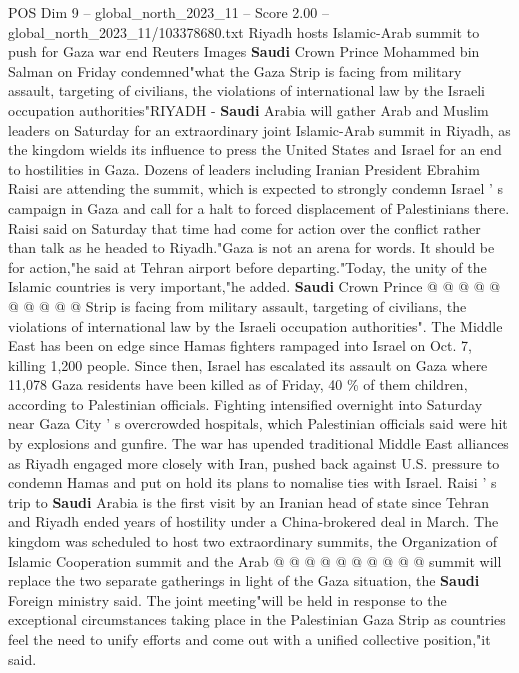\begin{textsample}{POS Dim 9 – global\_north\_2023\_11 – Score 2.00 – global\_north\_2023\_11/103378680.txt}  \label{ex:f9_pos_378}
Riyadh hosts Islamic-Arab summit to push for Gaza war end Reuters Images \textbf{Saudi} Crown Prince Mohammed bin Salman on Friday condemned"what the Gaza Strip is facing from military assault, targeting of civilians, the violations of international law by the Israeli occupation authorities"RIYADH - \textbf{Saudi} Arabia will gather Arab and Muslim leaders on Saturday for an extraordinary joint Islamic-Arab summit in Riyadh, as the kingdom wields its influence to press the United States and Israel for an end to hostilities in Gaza.
Dozens of leaders including Iranian President Ebrahim Raisi are attending the summit, which is expected to strongly condemn Israel ' s campaign in Gaza and call for a halt to forced displacement of Palestinians there.
Raisi said on Saturday that time had come for action over the conflict rather than talk as he headed to Riyadh."Gaza is not an arena for words.
It should be for action,"he said at Tehran airport before departing."Today, the unity of the Islamic countries is very important,"he added. \textbf{Saudi} Crown Prince @ @ @ @ @ @ @ @ @ @ Strip is facing from military assault, targeting of civilians, the violations of international law by the Israeli occupation authorities".
The Middle East has been on edge since Hamas fighters rampaged into Israel on Oct. 7, killing 1,200 people.
Since then, Israel has escalated its assault on Gaza where 11,078 Gaza residents have been killed as of Friday, 40 \% of them children, according to Palestinian officials.
Fighting intensified overnight into Saturday near Gaza City ' s overcrowded hospitals, which Palestinian officials said were hit by explosions and gunfire.
The war has upended traditional Middle East alliances as Riyadh engaged more closely with Iran, pushed back against U.S. pressure to condemn Hamas and put on hold its plans to nomalise ties with Israel.
Raisi ' s trip to \textbf{Saudi} Arabia is the first visit by an Iranian head of state since Tehran and Riyadh ended years of hostility under a China-brokered deal in March.
The kingdom was scheduled to host two extraordinary summits, the Organization of Islamic Cooperation summit and the Arab @ @ @ @ @ @ @ @ @ @ summit will replace the two separate gatherings in light of the Gaza situation, the \textbf{Saudi} Foreign ministry said.
The joint meeting"will be held in response to the exceptional circumstances taking place in the Palestinian Gaza Strip as countries feel the need to unify efforts and come out with a unified collective position,"it said.

\end{textsample}
